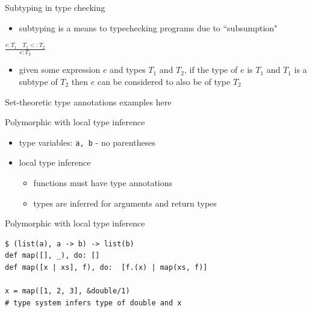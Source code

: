 \documentclass[
  ignorenonframetext,
  aspectratio=169]{beamer}
\newcommand{\passthrough}[1]{#1}
\providecommand{\tightlist}{%
  \setlength{\itemsep}{0pt}\setlength{\parskip}{0pt}}
\begin{document}
\begin{frame}{Subtyping in type checking}
\label{subtyping-in-type-checking}
\begin{itemize}
\tightlist
\item
  subtyping is a means to typechecking programs due to ``subsumption"
\end{itemize}

\huge

\begin{center}
 $\frac{e : T_1 \quad T_1 <: T_2}{e : T_2}$
 \end{center}

\begin{itemize}
\tightlist
\item
  given some expression \(e\) and types \(T_1\) and \(T_2\), if the type
  of \(e\) is \(T_1\) and \(T_1\) is a subtype of \(T_2\) then \(e\) can
  be considered to also be of type \(T_2\)
\end{itemize}
\end{frame}

\begin{frame}{Set-theoretic type annotations}
\label{set-theoretic-type-annotations}
examples here
\end{frame}

\begin{frame}[fragile]{Polymorphic with local type inference}
\label{polymorphic-with-local-type-inference}
\begin{itemize}
\tightlist
\item
  type variables: \passthrough{\lstinline!a, b!} - no parentheses
\item
  local type inference

  \begin{itemize}
  \tightlist
  \item
    functions must have type annotations
  \item
    types are inferred for arguments and return types
  \end{itemize}
\end{itemize}
\end{frame}

\begin{frame}[fragile]{Polymorphic with local type inference}
\label{polymorphic-with-local-type-inference-1}
\begin{lstlisting}
$ (list(a), a -> b) -> list(b)
def map([], _), do: []
def map([x | xs], f), do:  [f.(x) | map(xs, f)]

x = map([1, 2, 3], &double/1)
# type system infers type of double and x
\end{lstlisting}
\end{frame}
\end{document}
